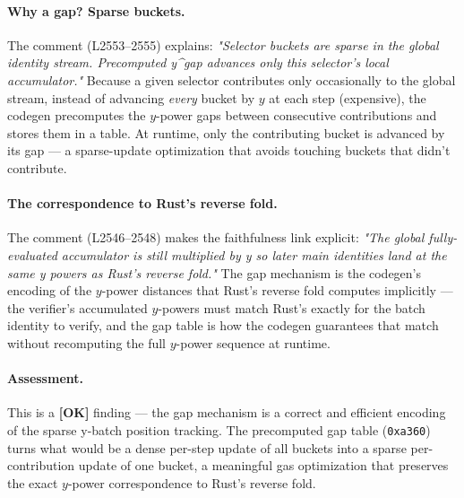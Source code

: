 \paragraph{Why a gap? Sparse buckets.} The comment (L2553--2555)
explains: \emph{"Selector buckets are sparse in the global
identity stream. Precomputed y\^{}gap advances only this
selector's local accumulator."} Because a given selector
contributes only occasionally to the global stream, instead of
advancing \emph{every} bucket by $y$ at each step (expensive), the
codegen precomputes the $y$-power gaps between consecutive
contributions and stores them in a table. At runtime, only the
contributing bucket is advanced by its gap --- a sparse-update
optimization that avoids touching buckets that didn't contribute.

\paragraph{The correspondence to Rust's reverse fold.} The comment
(L2546--2548) makes the faithfulness link explicit: \emph{"The
global fully-evaluated accumulator is still multiplied by y so
later main identities land at the same y powers as Rust's reverse
fold."} The gap mechanism is the codegen's encoding of the
$y$-power distances that Rust's reverse fold computes
implicitly --- the verifier's accumulated $y$-powers must match
Rust's exactly for the batch identity to verify, and the gap table
is how the codegen guarantees that match without recomputing the
full $y$-power sequence at runtime.

\paragraph{Assessment.} This is a
\textcolor{tracegreen}{\textbf{[OK]}} finding --- the gap
mechanism is a correct and efficient encoding of the sparse
y-batch position tracking. The precomputed gap table
(\texttt{0xa360}) turns what would be a dense per-step update of
all buckets into a sparse per-contribution update of one bucket,
a meaningful gas optimization that preserves the exact
$y$-power correspondence to Rust's reverse fold.

